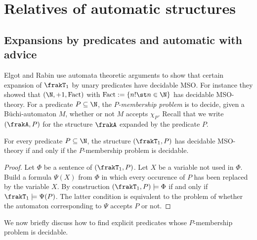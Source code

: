 

\section{Relatives of automatic structures}  \label{AS:sec:gen} 

\subsection{Expansions by predicates and automatic with advice}

 
Elgot and Rabin \cite{ElRa66} use automata theoretic arguments to show that certain expansion of $\frakT_1$ by unary
predicates have decidable MSO.  For instance they showed that $(\N,+1,\textrm{Fact})$
with $\textrm{Fact} := \{n! \st n \in \N\}$ has decidable MSO-theory.  For a predicate $P \subseteq \N$, the {\em $P$-membership problem} is to decide, given a B\"uchi-automaton $M$,  whether or not $M$ accepts $\chi_P$. Recall that we write $(\frakA,P)$ for the structure $\frakA$ expanded by the predicate $P$.

\begin{lemma} \cite{ElRa66}
For every predicate $P \subseteq \N$, the structure $(\frakT_1,P)$ has decidable
MSO-theory if and only if the $P$-membership problem is decidable.
\end{lemma}

\begin{proof}
Let $\Phi$ be a sentence of $(\frakT_1,P)$. Let $X$ be a
variable not used in $\Phi$.  Build a formula $\Psi(X)$ from $\Phi$ in which
every occurence of $P$ has been replaced by the variable $X$.  By construction
$(\frakT_1,P) \models \Phi$ if and only if $\frakT_1 \models \Psi(P)$.  The
latter condition is equivalent to the problem of whether the automaton
corresponding to $\Psi$ accepts $P$ or not.
\end{proof}

We now briefly discuss how to find explicit predicates whose $P$-membership problem is decidable.

